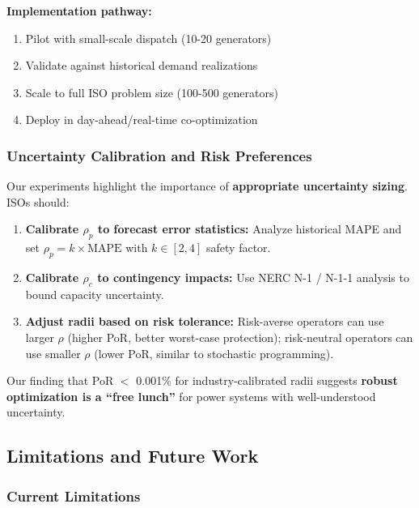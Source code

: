 \textbf{Implementation pathway:}
\begin{enumerate}
    \item Pilot with small-scale dispatch (10-20 generators)
    \item Validate against historical demand realizations
    \item Scale to full ISO problem size (100-500 generators)
    \item Deploy in day-ahead/real-time co-optimization
\end{enumerate}

\subsubsection{Uncertainty Calibration and Risk Preferences}

Our experiments highlight the importance of \textbf{appropriate uncertainty sizing}. ISOs should:

\begin{enumerate}
    \item \textbf{Calibrate $\rho_p$ to forecast error statistics:} Analyze historical MAPE and set $\rho_p = k \times \text{MAPE}$ with $k \in [2, 4]$ safety factor.

    \item \textbf{Calibrate $\rho_c$ to contingency impacts:} Use NERC N-1 / N-1-1 analysis to bound capacity uncertainty.

    \item \textbf{Adjust radii based on risk tolerance:} Risk-averse operators can use larger $\rho$ (higher PoR, better worst-case protection); risk-neutral operators can use smaller $\rho$ (lower PoR, similar to stochastic programming).
\end{enumerate}

Our finding that PoR $<$ 0.001\% for industry-calibrated radii suggests \textbf{robust optimization is a ``free lunch''} for power systems with well-understood uncertainty.

\subsection{Limitations and Future Work}
\label{sec:limitations_future_work}

\subsubsection{Current Limitations}

